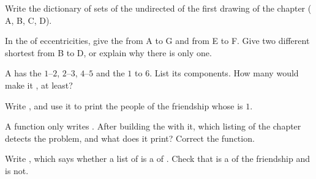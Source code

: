\begin{exercise}[$\star$]\label{exo:g10:graphs-first-look:2}
Write the dictionary of sets of the undirected  of the first drawing of the chapter ( A, B, C, D).
\end{exercise}

\begin{exercise}[$\star$]\label{exo:g10:graphs-first-look:3}
In the  of eccentricities, give the  from A to G and from E to F. Give two different shortest 
from B to D, or explain why there is only one.
\end{exercise}

\begin{exercise}[$\star$]\label{exo:g10:graphs-first-look:4}
A  has the  $1$--$2$, $2$--$3$, $4$--$5$ and the  $1$ to $6$. List its components. How many 
would make it , at least?
\end{exercise}

\begin{exercise}[$\star$]\label{exo:g10:graphs-first-look:5}
Write , and use it to print the people of the friendship  whose  is $1$.
\end{exercise}

\begin{exercise}[$\star\star$]\label{exo:g10:graphs-first-look:6}
A function  only writes . After building the  with it, which
listing of the chapter detects the problem, and what does it print? Correct the function.
\end{exercise}

\begin{exercise}[$\star\star$]\label{exo:g10:graphs-first-look:7}
Write , which says whether a list of  is a  of . Check that
\code{[3, 2, 10, 1, 28]} is a  of the friendship  and \code{[3, 1]} is not.
\end{exercise}


